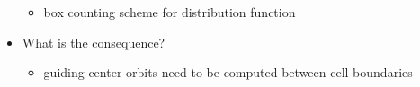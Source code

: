 \documentclass{beamer}
\begin{document}
\begin{frame}
\begin{columns}[onlytextwidth]
\begin{column}{0.6\textwidth}
\begin{itemize}
\begin{itemize}
\item box counting scheme for distribution function
\end{itemize}
\item What is the consequence?\\
\begin{itemize}
\item guiding-center orbits need to be computed between cell boundaries
\end{itemize}
\end{itemize}
\end{column}
\end{columns}
\end{frame}


\end{document}

